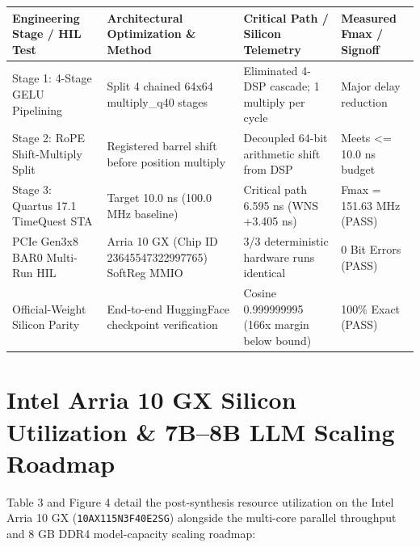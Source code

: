 \documentclass[11pt,a4paper]{article}
\begin{document}
{\footnotesize\renewcommand{\arraystretch}{1.14}\begin{longtable}{@{}L{0.23\textwidth}L{0.27\textwidth}L{0.24\textwidth}L{0.16\textwidth}@{}}\toprule

\textbf{Engineering Stage /\allowbreak{} HIL Test} & \textbf{Architectural Optimization \& Method} & \textbf{Critical Path /\allowbreak{} Silicon Telemetry} & \textbf{Measured Fmax /\allowbreak{} Signoff}\\\midrule\endhead

Stage 1: 4-Stage GELU Pipelining & Split 4 chained 64x64 multiply\_\allowbreak{}q40 stages & Eliminated 4-DSP cascade; 1 multiply per cycle & Major delay reduction\\[2pt]

Stage 2: RoPE Shift-Multiply Split & Registered barrel shift before position multiply & Decoupled 64-bit arithmetic shift from DSP & Meets <=\allowbreak{} 10.0 ns budget\\[2pt]

Stage 3: Quartus 17.1 TimeQuest STA & Target 10.0 ns (\allowbreak{}100.0 MHz baseline)\allowbreak{} & Critical path 6.595 ns (\allowbreak{}WNS +\allowbreak{}3.405 ns)\allowbreak{} & Fmax =\allowbreak{} 151.63 MHz (\allowbreak{}PASS)\allowbreak{}\\[2pt]

PCIe Gen3x8 BAR0 Multi-Run HIL & Arria 10 GX (\allowbreak{}Chip ID 23645547\allowbreak{}32299776\allowbreak{}5)\allowbreak{} SoftReg MMIO & 3/\allowbreak{}3 deterministic hardware runs identical & 0 Bit Errors (\allowbreak{}PASS)\allowbreak{}\\[2pt]

Official-Weight Silicon Parity & End-to-end HuggingFace checkpoint verification & Cosine 0.99999999\allowbreak{}5 (\allowbreak{}166x margin below bound)\allowbreak{} & 100\% Exact (\allowbreak{}PASS)\allowbreak{}\\[2pt]

\bottomrule\end{longtable}}

\section{Intel Arria 10 GX Silicon Utilization \& 7B--8B LLM Scaling Roadmap}

Table 3 and Figure 4 detail the post-synthesis resource utilization on the Intel Arria 10 GX (\texttt{10AX115N3F40E2SG}) alongside the multi-core parallel throughput and 8 GB DDR4 model-capacity scaling roadmap:
\end{document}
